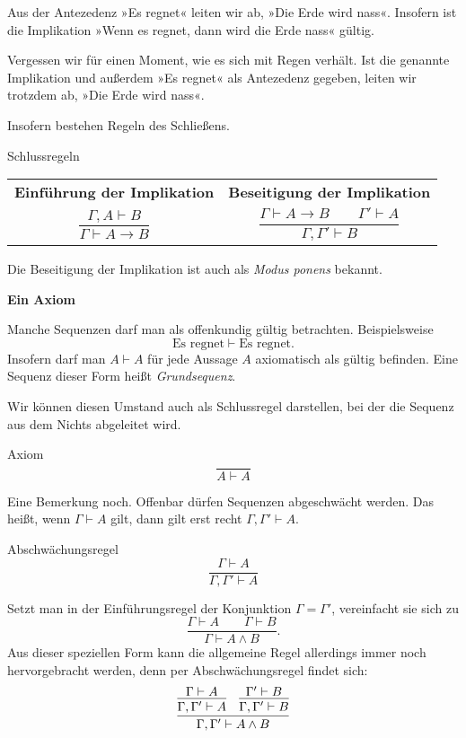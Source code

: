 \documentclass[8pt]{beamer}
\newcommand{\strong}[1]{\textsf{\textbf{#1}}}
\newcommand{\centerheadline}[1]{%
  \begin{center}\strong{#1}\end{center}}
\newcommand{\parspace}{\vspace{0.8em}}
\newcommand{\cond}{\rightarrow}
\begin{document}
\begin{frame}
Aus der Antezedenz »Es regnet« leiten wir ab, »Die Erde wird nass«.
Insofern ist die Implikation »Wenn es regnet, dann wird die Erde
nass« gültig.\pause

\parspace
Vergessen wir für einen Moment, wie es sich mit Regen verhält.
Ist die genannte Implikation und außerdem »Es regnet« als
Antezedenz gegeben, leiten wir trotzdem ab, »Die Erde wird nass«.\pause

\parspace
Insofern bestehen Regeln des Schließens.
\begin{block}{Schlussregeln}
\begin{center}
\begin{tabular}{c@{\qquad\quad}c}
\strong{\small Einführung der Implikation}
& \strong{\small Beseitigung der Implikation}\\[6pt]
$\dfrac{\Gamma,A\vdash B}{\Gamma\vdash A\cond B}$
& $\dfrac{\Gamma\vdash A\cond B\qquad\Gamma'\vdash A}{\Gamma,\Gamma'\vdash B}$\\
\end{tabular}
\end{center}
\end{block}\pause

\parspace
Die Beseitigung der Implikation ist auch als \emph{Modus ponens}
bekannt.
\end{frame}

\begin{frame}
\centerheadline{Ein Axiom}
\end{frame}

\begin{frame}
Manche Sequenzen darf man als offenkundig gültig betrachten. Beispielsweise
\[\text{Es regnet}\vdash\text{Es regnet}.\]\pause
Insofern darf man $A\vdash A$ für jede Aussage $A$
axiomatisch als gültig befinden. Eine Sequenz dieser Form heißt
\emph{Grundsequenz}.\pause

\parspace
Wir können diesen Umstand auch als Schlussregel darstellen, bei der
die Sequenz aus dem Nichts abgeleitet wird.
\begin{block}{Axiom}
\[\dfrac{}{A\vdash A}\]
\end{block}
\end{frame}

\begin{frame}
Eine Bemerkung noch. Offenbar dürfen Sequenzen abgeschwächt werden.
Das heißt, wenn
$\Gamma\vdash A$ gilt, dann gilt erst recht $\Gamma,\Gamma'\vdash A$.\pause
\begin{block}{Abschwächungsregel}
\[\dfrac{\Gamma\vdash A}{\Gamma,\Gamma'\vdash A}\]
\end{block}\pause
Setzt man in der Einführungsregel der Konjunktion $\Gamma=\Gamma'$, vereinfacht sie sich zu
\[\dfrac{\Gamma\vdash A\qquad\Gamma\vdash B}{\Gamma\vdash A\land B}.\]
Aus dieser speziellen Form kann die allgemeine Regel allerdings immer noch
hervorgebracht werden, denn per Abschwächungsregel findet sich:
\[
\infer{\Gamma,\Gamma'\vdash A\land B}{
  \infer{\Gamma,\Gamma'\vdash A}{\Gamma\vdash A}
& \infer{\Gamma,\Gamma'\vdash B}{\Gamma'\vdash B}}
\]
\end{frame}
\end{document}
